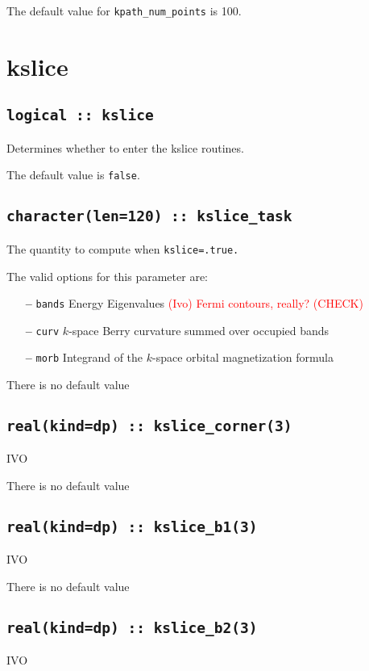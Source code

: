 The default value for \verb#kpath_num_points# is 100.




\clearpage
\section{kslice}

\subsection[berry]{\tt logical :: kslice}
Determines whether to enter the kslice routines.

The default value is \verb#false#.

\subsection[kslice\_task]{\tt character(len=120) ::  kslice\_task}
The quantity to compute when {\tt kslice=.true.} 

The valid options for this parameter are:
\begin{itemize}
\item[{\bf --}]  \verb#bands# Energy Eigenvalues
\textcolor{red}{(Ivo) Fermi contours, really? (CHECK)}
\item[{\bf --}] \verb#curv# $k$-space Berry curvature summed over
  occupied bands
\item[{\bf --}] \verb#morb# Integrand of the $k$-space orbital
  magnetization formula
\end{itemize}
There is no default value

\subsection[kslice\_corner]{\tt real(kind=dp) :: kslice\_corner(3)}
IVO

There is no default value

\subsection[kslice\_corner]{\tt real(kind=dp) :: kslice\_b1(3)}
IVO

There is no default value

\subsection[kslice\_corner]{\tt real(kind=dp) :: kslice\_b2(3)}
IVO

